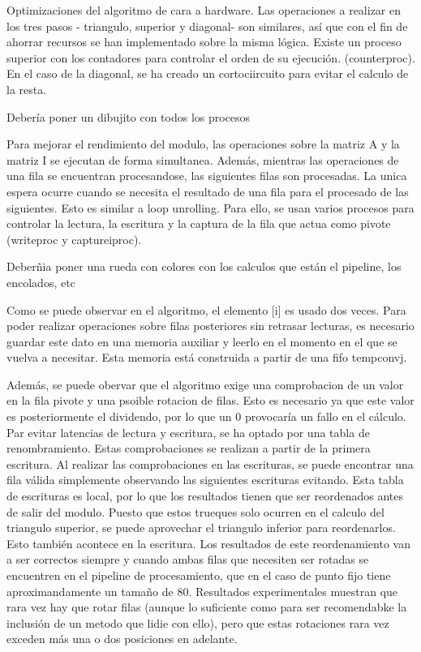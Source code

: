 Optimizaciones del algoritmo de cara a hardware.
Las operaciones a realizar en los tres pasos - triangulo, superior y diagonal- son similares, así que con el fin de ahorrar recursos se han implementado sobre la misma lógica. Existe un proceso superior con los contadores para controlar el orden de su ejecución. (counterproc). En el caso de la diagonal, se ha creado un cortociircuito para evitar el calculo de la resta.

Debería poner un dibujito con todos los procesos

Para mejorar el rendimiento del modulo, las operaciones sobre la matriz A y la matriz I se ejecutan de forma simultanea. Además, mientras las operaciones de una fila se encuentran procesandose, las siguientes filas son procesadas. La unica espera ocurre cuando se necesita el resultado de una fila para el procesado de las siguientes. Esto es similar a loop unrolling. Para ello, se usan varios procesos para controlar la lectura, la escritura y la captura de la fila que actua como pivote (writeproc y captureiproc). 

Deberñia poner una rueda con colores con los calculos que están el pipeline, los encolados, etc

Como se puede observar en el algoritmo, el elemento [i] es usado dos veces. Para poder realizar operaciones sobre filas posteriores sin retrasar lecturas, es necesario guardar este dato en una memoria auxiliar y leerlo en el momento en el que se vuelva a necesitar. Esta memoria está construida a partir de una fifo tempconvj.

Además, se puede obervar que el algoritmo exige una comprobacion de un valor en la fila pivote y una psoible rotacion de filas. Esto es necesario ya que este valor es posteriormente el dividendo, por lo que un 0 provocaría un fallo en el cálculo. Par evitar latencias de lectura y escritura, se ha optado por una tabla de renombramiento. Estas comprobaciones se realizan a partir de la primera escritura. Al realizar las comprobaciones en las escrituras, se puede encontrar una fila válida simplemente observando las siguientes escrituras evitando. Esta tabla de escrituras es local, por lo que los resultados tienen que ser reordenados antes de salir del modulo. Puesto que estos trueques solo ocurren en el calculo del triangulo superior, se puede aprovechar el triangulo inferior para reordenarlos. Esto también acontece en la escritura. Los resultados de este reordenamiento van a ser correctos siempre y cuando ambas filas que necesiten ser rotadas se encuentren en el pipeline de procesamiento, que en el caso de  punto fijo tiene aproximandamente un tamaño de 80. Resultados experimentales muestran que rara vez hay que rotar filas (aunque lo suficiente como para ser recomendabke la inclusión de un metodo que lidie con ello), pero que estas rotaciones rara vez exceden más una o dos posiciones en adelante.

